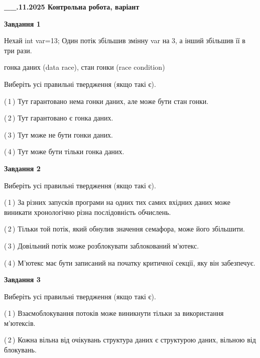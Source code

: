 \documentclass[12pt, ukrainian]{article}
\begin{document}
\begin {large}

\textbf{\_\_.11.2025 Контрольна робота, варіант  }\par


{

\begin{center}
\textbf{Завдання 1}
\end{center}
Нехай int var=13; Один потік збільшив змінну var на 3, а інший збільшив її в три рази.

гонка даних (data race), стан гонки (race condition)

Виберіть усі правильні твердження (якщо такі є).\par
\vspace{2mm}
(\,1\,) Тут гарантовано нема гонки даних, але може бути стан гонки.%

(\,2\,) Тут гарантовано є гонка даних.%

(\,3\,) Тут може не бути гонки даних.%

(\,4\,) Тут може бути тільки гонка даних.%



\begin{center}
\textbf{Завдання 2}
\end{center}
Виберіть усі правильні твердження (якщо такі є).\par
\vspace{2mm}

(\,1\,) За різних запусків програми на одних тих самих вхідних даних може виникати хронологічно різна послідовність обчислень.%

(\,2\,) Тільки той потік, який обнулив значення семафора, може його збільшити.%

(\,3\,) Довільний потік може розблокувати заблокований м’ютекс.%

(\,4\,) М’ютекс має бути записаний на початку критичної секції, яку він забезпечує.%



\begin{center}
\textbf{Завдання 3}
\end{center}
Виберіть усі правильні твердження (якщо такі є).\par
\vspace{2mm}

(\,1\,) Взаємоблокування потоків може виникнути тільки за використання м’ютексів.%

(\,2\,) Кожна вільна від очікувань структура даних є структурою даних, вільною від блокувань.%

}
\end{large}
\end{document}
